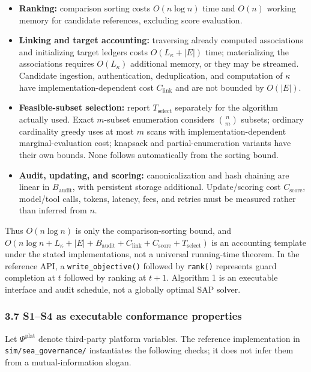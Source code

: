 \documentclass[
  11pt]{article}
\providecommand{\tightlist}{%
  \setlength{\itemsep}{0pt}\setlength{\parskip}{0pt}}
\begin{document}
\begin{itemize}
\tightlist
\item
  \textbf{Ranking:} comparison sorting costs \(O(n\log n)\) time and
  \(O(n)\) working memory for candidate references, excluding score
  evaluation.
\item
  \textbf{Linking and target accounting:} traversing already computed
  associations and initializing target ledgers costs \(O(L_\kappa+|E|)\)
  time; materializing the associations requires \(O(L_\kappa)\)
  additional memory, or they may be streamed. Candidate ingestion,
  authentication, deduplication, and computation of \(\kappa\) have
  implementation-dependent cost \(C_{\mathrm{link}}\) and are not
  bounded by \(O(|E|)\).
\item
  \textbf{Feasible-subset selection:} report \(T_{\mathrm{select}}\)
  separately for the algorithm actually used. Exact \(m\)-subset
  enumeration considers \(\binom nm\) subsets; ordinary cardinality
  greedy uses at most \(m\) scans with implementation-dependent
  marginal-evaluation cost; knapsack and partial-enumeration variants
  have their own bounds. None follows automatically from the sorting
  bound.
\item
  \textbf{Audit, updating, and scoring:} canonicalization and hash
  chaining are linear in \(B_{\mathrm{audit}}\), with persistent storage
  additional. Update/scoring cost \(C_{\mathrm{score}}\), model/tool
  calls, tokens, latency, fees, and retries must be measured rather than
  inferred from \(n\).
\end{itemize}

Thus \(O(n\log n)\) is only the comparison-sorting bound, and
\(O(n\log n+L_\kappa+|E|+B_{\mathrm{audit}}+C_{\mathrm{link}}+C_{\mathrm{score}}+T_{\mathrm{select}})\)
is an accounting template under the stated implementations, not a
universal running-time theorem. In the reference API, a
\texttt{write\_objective()} followed by \texttt{rank()} represents guard
completion at \(t\) followed by ranking at \(t+1\). Algorithm 1 is an
executable interface and audit schedule, not a globally optimal SAP
solver.

\subsubsection{3.7 S1--S4 as executable conformance
properties}\label{s1s4-as-executable-conformance-properties}

Let \(\Psi^{\mathrm{plat}}\) denote third-party platform variables. The
reference implementation in \texttt{sim/sea\_governance/} instantiates
the following checks; it does not infer them from a mutual-information
slogan.
\end{document}
